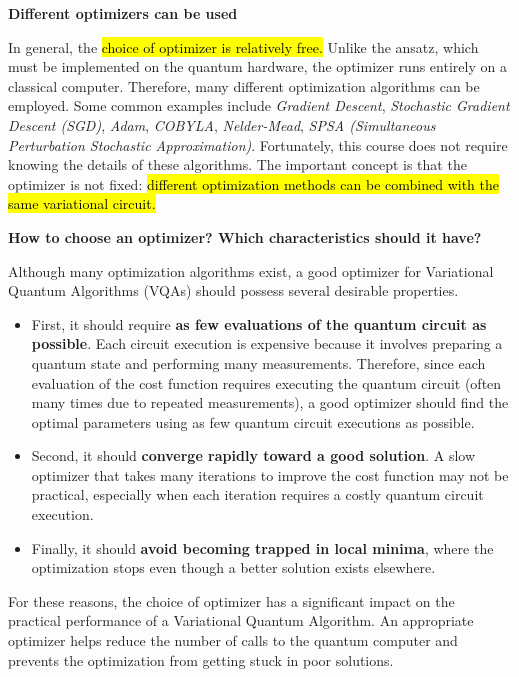 \highspace
\begin{flushleft}
    \textcolor{Green3}{ \textbf{Different optimizers can be used}}
\end{flushleft}
In general, the \hl{choice of optimizer is relatively free.} Unlike the ansatz, which must be implemented on the quantum hardware, the optimizer runs entirely on a classical computer. Therefore, many different optimization algorithms can be employed. Some common examples include \emph{Gradient Descent}, \emph{Stochastic Gradient Descent (SGD)}, \emph{Adam}, \emph{COBYLA}, \emph{Nelder-Mead}, \emph{SPSA (Simultaneous Perturbation Stochastic Approximation)}. Fortunately, this course does not require knowing the details of these algorithms. The important concept is that the optimizer is not fixed: \hl{different optimization methods can be combined with the same variational circuit.}

\highspace
\begin{flushleft}
    \textcolor{Green3}{ \textbf{How to choose an optimizer? Which characteristics should it have?}}
\end{flushleft}
Although many optimization algorithms exist, a good optimizer for Variational Quantum Algorithms (VQAs) should possess several desirable properties.
\begin{itemize}
    \item First, it should require \textbf{as few evaluations of the quantum circuit as possible}. Each circuit execution is expensive because it involves preparing a quantum state and performing many measurements. Therefore, since each evaluation of the cost function requires executing the quantum circuit (often many times due to repeated measurements), a good optimizer should find the optimal parameters using as few quantum circuit executions as possible.
    \item Second, it should \textbf{converge rapidly toward a good solution}. A slow optimizer that takes many iterations to improve the cost function may not be practical, especially when each iteration requires a costly quantum circuit execution.
    \item Finally, it should \textbf{avoid becoming trapped in local minima}, where the optimization stops even though a better solution exists elsewhere.
\end{itemize}
For these reasons, the choice of optimizer has a significant impact on the practical performance of a Variational Quantum Algorithm. An appropriate optimizer helps reduce the number of calls to the quantum computer and prevents the optimization from getting stuck in poor solutions.

